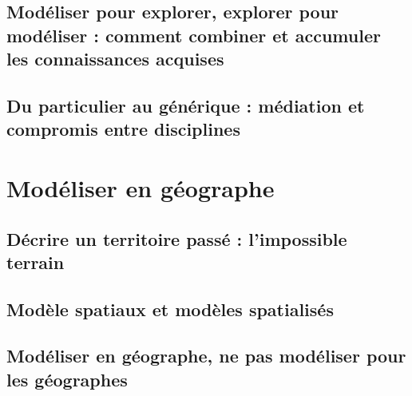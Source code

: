 \subsection{Modéliser pour explorer, explorer pour modéliser : comment combiner et accumuler les connaissances acquises}
\subsection{Du particulier au générique : médiation et compromis entre disciplines}

\section{Modéliser en géographe}
\subsection{Décrire un territoire passé : l'impossible terrain}
\subsection{Modèle spatiaux et modèles spatialisés}
\subsection{Modéliser en géographe, ne pas modéliser pour les géographes}
